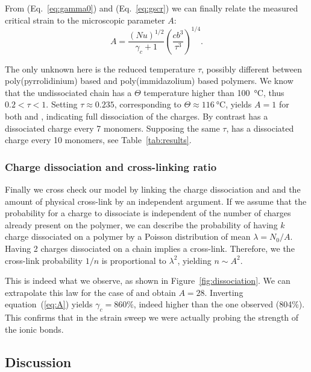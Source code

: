 \documentclass[journal=jacsat,manuscript=article]{achemso}
\begin{document}
From (Eq.~\ref{eq:gamma0}) and (Eq.~\ref{eq:gscr}) we can finally relate the measured critical strain to the microscopic parameter $A$:
\begin{equation}
A = \frac{\left(N u\right)^{1/2}}{\gamma_c+1}\left(\frac{c b^3}{\tau^3}\right)^{1/4}.
\label{eq:A}
\end{equation}

The only unknown here is the reduced temperature $\tau$, possibly different between poly(pyrrolidinium) based and poly(immidazolium) based polymers. We know that the undissociated chain has a $\Theta$ temperature higher than \SI{100}{\celsius}, thus $0.2<\tau<1$. Setting $\tau\approx 0.235$, corresponding to $\Theta\approx\SI{116}{\celsius}$, yields $A=1$ for both  and , indicating full dissociation of the charges. By contrast  has a dissociated charge every 7 monomers. Supposing the same $\tau$,  has a dissociated charge every 10 monomers, see Table~\ref{tab:results}.

\subsubsection{Charge dissociation and cross-linking ratio}

Finally we cross check our model by linking the charge dissociation and and the amount of physical cross-link by an independent argument. If we assume that the probability for a charge to dissociate is independent of the number of charges already present on the polymer, we can describe the probability of having $k$ charge dissociated on a polymer by a Poisson distribution of mean $\lambda = N_0/A$. Having 2 charges dissociated on a chain implies a cross-link. Therefore, we the cross-link probability $1/n$ is proportional to $\lambda^2$, yielding $n \sim A^2$.

This is indeed what we observe, as shown in Figure~\ref{fig:dissociation}. We can extrapolate this law for the case of  and obtain $A = 28$. Inverting equation~(\ref{eq:A}) yields $\gamma_c = 860\%$, indeed higher than the one observed (804\%). This confirms that in the  strain sweep we were actually probing the strength of the ionic bonds.




\subsection{Discussion}
\end{document}
